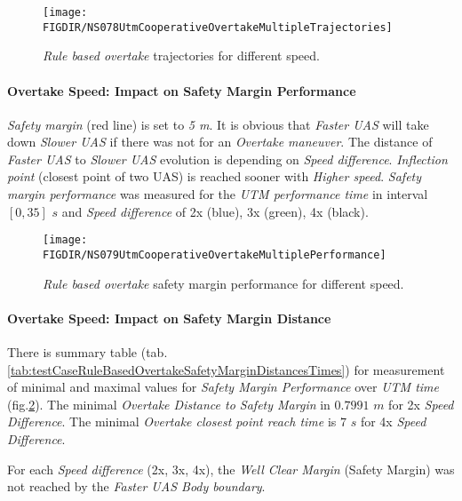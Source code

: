     \begin{figure}[H]
        \centering
        \texttt{[image: \\FIGDIR/NS078UtmCooperativeOvertakeMultipleTrajectories]}
        \caption{\emph{Rule based overtake} trajectories for different speed.}
        \label{fig:testCaseRuleBasedOvertakeDifferentSpeedTrajectoriesPerformance}
    \end{figure}
    
    \paragraph{Overtake Speed: Impact on Safety Margin Performance} \emph{Safety margin} (red line) is set to \emph{5 m}. It is obvious that \emph{Faster UAS} will take down \emph{Slower UAS} if there was not for an \emph{Overtake maneuver}.  The distance of \emph{Faster UAS} to \emph{Slower UAS} evolution is depending on \emph{Speed difference}. \emph{Inflection point} (closest point of two UAS) is reached sooner with \emph{Higher speed}. \emph{Safety margin performance} was measured for the \emph{UTM performance time} in interval $[0,35]$ $s$ and \emph{Speed difference} of 2x (blue), 3x (green), 4x (black).
    
    \begin{figure}[H]
        \centering
        \texttt{[image: \\FIGDIR/NS079UtmCooperativeOvertakeMultiplePerformance]}
        \caption{\emph{Rule based overtake} safety margin performance for different speed.}
        \label{fig:testRuleBasedOvertakeSafetyMarginForDifferentSpeedPerformance}
    \end{figure}
    
    \paragraph{Overtake Speed: Impact on Safety Margin Distance} There is summary table (tab. \ref{tab:testCaseRuleBasedOvertakeSafetyMarginDistancesTimes}) for  measurement of minimal and maximal values for \emph{Safety Margin Performance} over \emph{UTM time} (fig.\ref{fig:testRuleBasedOvertakeSafetyMarginForDifferentSpeedPerformance}). The minimal \emph{Overtake Distance to Safety Margin} in $0.7991$ $m$ for 2x \emph{Speed Difference}. The minimal \emph{Overtake closest point reach time} is $7$ $s$ for 4x \emph{Speed Difference}.
    
    For each \emph{Speed difference} (2x, 3x, 4x), the \emph{Well Clear Margin} (Safety Margin) was not reached by the \emph{Faster UAS Body boundary}.  
    

